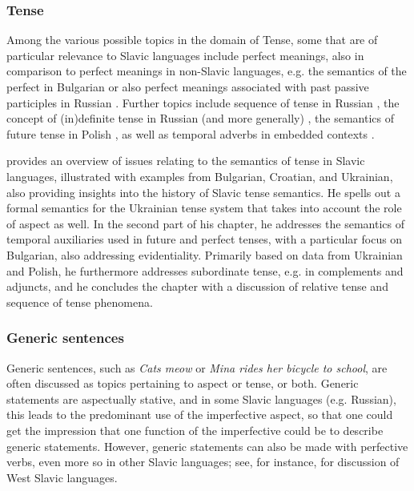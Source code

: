 \documentclass[output=paper,colorlinks,citecolor=brown]{langscibook}
\begin{document}
\subsubsection{Tense} Among the various possible topics in the domain of Tense, some that are of particular relevance to Slavic languages include perfect meanings, also in comparison to perfect meanings in non-Slavic languages, e.g. the semantics of the perfect in Bulgarian \citep{Izvorski1997,iatridou01} or also perfect meanings associated with past passive participles in Russian \citep{Paslawska.Stechow2003}. Further topics include sequence of tense in Russian \citep{babyonyshev-matushansky06,Khomitsevich2007,gronn_stechow2010}, the concept of (in)definite tense in Russian (and more generally) \citep{gronn15}, the semantics of future tense in Polish \citep{blaszczak-etal12}, as well as temporal adverbs in embedded contexts \citep{vostrikova18}.

 provides an overview of issues relating to the semantics of tense in Slavic languages, illustrated with examples from Bulgarian, Croatian, and Ukrainian, also providing insights into the history of Slavic tense semantics. He spells out a formal semantics for the Ukrainian tense system that takes into account the role of aspect as well. In the second part of his chapter, he addresses the semantics of temporal auxiliaries used in future and perfect tenses, with a particular focus on Bulgarian, also addressing evidentiality. Primarily based on data from Ukrainian and Polish, he furthermore addresses subordinate tense, e.g. in complements and adjuncts, and he concludes the chapter with a discussion of relative tense and sequence of tense phenomena. 

\subsubsection{Generic sentences} 

Generic sentences, such as \textit{Cats meow} or \textit{Mina rides her bicycle to school}, are often discussed as topics pertaining to aspect or tense, or both. Generic statements are aspectually stative, and in some Slavic languages (e.g. Russian), this leads to the predominant use of the imperfective aspect, so that one could get the impression that one function of the imperfective could be to describe generic statements. However, generic statements can also be made with perfective verbs, even more so in other Slavic languages; see, for instance, \citet{Filip.Carlson1997,muellerreichau17} for discussion of West Slavic languages. 
\end{document}
